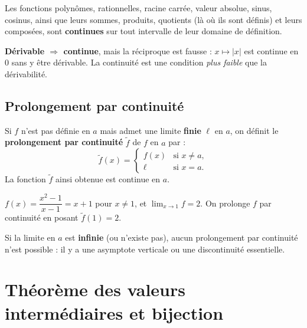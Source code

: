 \begin{propriete}
Les fonctions polynômes, rationnelles, racine carrée, valeur absolue, sinus, cosinus, ainsi que leurs sommes, produits, quotients (là où ils sont définis) et leurs composées, sont \textbf{continues} sur tout intervalle de leur domaine de définition.
\end{propriete}

\begin{aretenir}
\textbf{Dérivable $\Rightarrow$ continue}, mais la réciproque est fausse : $x\mapsto|x|$ est continue en $0$ sans y être dérivable. La continuité est une condition \emph{plus faible} que la dérivabilité.
\end{aretenir}

\subsection{Prolongement par continuité}

\begin{definition}
Si $f$ n'est pas définie en $a$ mais admet une limite \textbf{finie} $\ell$ en $a$, on définit le \textbf{prolongement par continuité} $\tilde f$ de $f$ en $a$ par :
\[
\tilde f(x)=
\begin{cases}
f(x) & \text{si } x\neq a,\\
\ell & \text{si } x=a.
\end{cases}
\]
La fonction $\tilde f$ ainsi obtenue est continue en $a$.
\end{definition}

\begin{exemple}
$f(x)=\dfrac{x^{2}-1}{x-1}=x+1$ pour $x\neq1$, et $\displaystyle\lim_{x\to1}f=2$. On prolonge $f$ par continuité en posant $\tilde f(1)=2$.
\end{exemple}

\begin{remarque}
Si la limite en $a$ est \textbf{infinie} (ou n'existe pas), aucun prolongement par continuité n'est possible : il y a une asymptote verticale ou une discontinuité essentielle.
\end{remarque}

\section{Théorème des valeurs intermédiaires et bijection}

